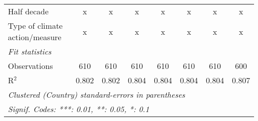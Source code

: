 \begin{tabular}{lccccccc}
   Half decade                                                                              & x              & x              & x              & x              & x              & x              & x\\  
   Type of climate action/measure                                                           & x              & x              & x              & x              & x              & x              & x\\  
   \midrule \emph{Fit statistics}\\
   Observations                                                                             & 610            & 610            & 610            & 610            & 610            & 610            & 600\\  
   R$^2$                                                                                    & 0.802          & 0.802          & 0.804          & 0.804          & 0.804          & 0.804          & 0.807\\  
   \midrule
   \multicolumn{8}{l}{\emph{Clustered (Country) standard-errors in parentheses}}\\
   \multicolumn{8}{l}{\emph{Signif. Codes: ***: 0.01, **: 0.05, *: 0.1}}\\
\end{tabular}
\par\endgroup


